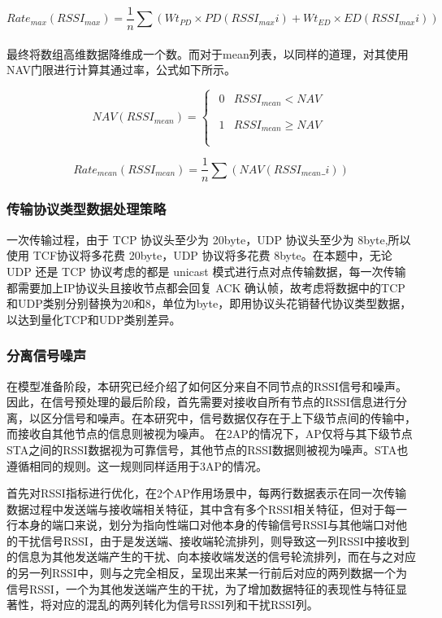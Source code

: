 \begin{equation}
	Rate_{max}\left( RSSI_{max} \right) =\frac{1}{n}\sum{\left( Wt_{PD}\times PD\left( RSSI_{max}i \right) +Wt_{ED}\times ED\left( RSSI_{max}i \right) \right)}
\end{equation}
\\
最终将数组高维数据降维成一个数。而对于mean列表，以同样的道理，对其使用NAV门限进行计算其通过率，公式如下所示。

\begin{equation}
	NAV\left( RSSI_{mean} \right) =\left\{ \begin{array}{l}
		\begin{matrix}
			0&		RSSI_{mean}<NAV\\
		\end{matrix}\\
		\begin{matrix}
			1&		RSSI_{mean}\ge NAV\\
		\end{matrix}\\
	\end{array} \right. 
\end{equation}

\begin{equation}
	Rate_{mean}\left( RSSI_{mean} \right) =\frac{1}{n}\sum{\left( NAV\left( RSSI_{mean}\_i \right) \right)}
\end{equation}

\subsubsection{传输协议类型数据处理策略}

一次传输过程，由于 TCP 协议头至少为 20byte，UDP 协议头至少为 8byte,所以使用 TCF协议将多花费 20byte，UDP 协议将多花费 8byte。在本题中，无论 UDP 还是 TCP 协议考虑的都是 unicast 模式进行点对点传输数据，每一次传输都需要加上IP协议头且接收节点都会回复 ACK 确认帧，故考虑将数据中的TCP和UDP类别分别替换为20和8，单位为byte，即用协议头花销替代协议类型数据，以达到量化TCP和UDP类别差异。

\subsubsection{分离信号噪声}

在模型准备阶段，本研究已经介绍了如何区分来自不同节点的RSSI信号和噪声。因此，在信号预处理的最后阶段，首先需要对接收自所有节点的RSSI信息进行分离，以区分信号和噪声。在本研究中，信号数据仅存在于上下级节点间的传输中，而接收自其他节点的信息则被视为噪声。
在2AP的情况下，AP仅将与其下级节点STA之间的RSSI数据视为可靠信号，其他节点的RSSI数据则被视为噪声。STA也遵循相同的规则。这一规则同样适用于3AP的情况。

首先对RSSI指标进行优化，在2个AP作用场景中，每两行数据表示在同一次传输数据过程中发送端与接收端相关特征，其中含有多个RSSI相关特征，但对于每一行本身的端口来说，划分为指向性端口对他本身的传输信号RSSI与其他端口对他的干扰信号RSSI，由于是发送端、接收端轮流排列，则导致这一列RSSI中接收到的信息为其他发送端产生的干扰、向本接收端发送的信号轮流排列，而在与之对应的另一列RSSI中，则与之完全相反，呈现出来某一行前后对应的两列数据一个为信号RSSI，一个为其他发送端产生的干扰，为了增加数据特征的表现性与特征显著性，将对应的混乱的两列转化为信号RSSI列和干扰RSSI列。
